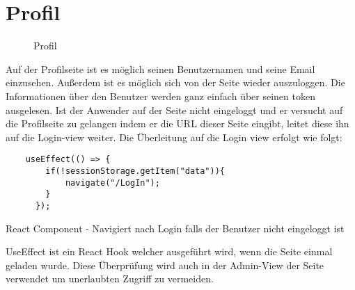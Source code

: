 \section{Profil}
\label{profile}

\begin{figure}[H]
    \begin{center}
      \caption{Profil}
    \end{center}
\end{figure}

Auf der Profilseite ist es möglich seinen Benutzernamen und seine Email einzusehen. Außerdem ist es  
möglich sich von der Seite wieder auszuloggen. Die Informationen über den Benutzer werden ganz einfach über 
seinen token ausgelesen. Ist der Anwender auf der Seite nicht eingeloggt und er versucht auf die Profilseite
zu gelangen indem er die URL dieser Seite eingibt, leitet diese ihn auf die Login-view weiter. Die
Überleitung auf die Login view erfolgt wie folgt:

\begin{code}[htp]
\begin{lstlisting}
    useEffect(() => {
        if(!sessionStorage.getItem("data")){
            navigate("/LogIn");
        }
      });
\end{lstlisting}
\caption{React Component - Navigiert nach Login falls der Benutzer nicht eingeloggt ist}
\end{code}

UseEffect ist ein React Hook welcher ausgeführt wird, wenn die Seite einmal geladen wurde. Diese 
Überprüfung wird auch in der Admin-View der Seite verwendet um unerlaubten Zugriff zu vermeiden.